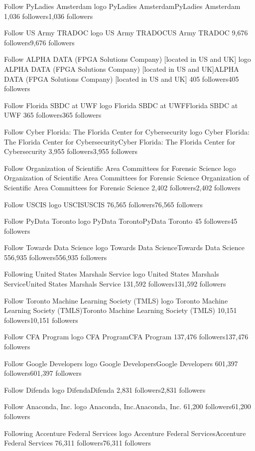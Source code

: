 Follow
PyLadies Amsterdam logo
PyLadies AmsterdamPyLadies Amsterdam
1,036 followers1,036 followers

Follow
US Army TRADOC logo
US Army TRADOCUS Army TRADOC
9,676 followers9,676 followers

Follow
ALPHA DATA (FPGA Solutions Company)  [located in US and UK] logo
ALPHA DATA (FPGA Solutions Company) [located in US and UK]ALPHA DATA (FPGA Solutions Company) [located in US and UK]
405 followers405 followers

Follow
Florida SBDC at UWF logo
Florida SBDC at UWFFlorida SBDC at UWF
365 followers365 followers

Follow
Cyber Florida: The Florida Center for Cybersecurity logo
Cyber Florida: The Florida Center for CybersecurityCyber Florida: The Florida Center for Cybersecurity
3,955 followers3,955 followers

Follow
Organization of Scientific Area Committees for Forensic Science  logo
Organization of Scientific Area Committees for Forensic Science Organization of Scientific Area Committees for Forensic Science 
2,402 followers2,402 followers

Follow
USCIS logo
USCISUSCIS
76,565 followers76,565 followers

Follow
PyData Toronto logo
PyData TorontoPyData Toronto
45 followers45 followers

Follow
Towards Data Science logo
Towards Data ScienceTowards Data Science
556,935 followers556,935 followers

Following
United States Marshals Service logo
United States Marshals ServiceUnited States Marshals Service
131,592 followers131,592 followers

Follow
Toronto Machine Learning Society (TMLS) logo
Toronto Machine Learning Society (TMLS)Toronto Machine Learning Society (TMLS)
10,151 followers10,151 followers

Follow
CFA Program logo
CFA ProgramCFA Program
137,476 followers137,476 followers

Follow
Google Developers logo
Google DevelopersGoogle Developers
601,397 followers601,397 followers

Follow
Difenda logo
DifendaDifenda
2,831 followers2,831 followers

Follow
Anaconda, Inc. logo
Anaconda, Inc.Anaconda, Inc.
61,200 followers61,200 followers

Following
Accenture Federal Services logo
Accenture Federal ServicesAccenture Federal Services
76,311 followers76,311 followers

